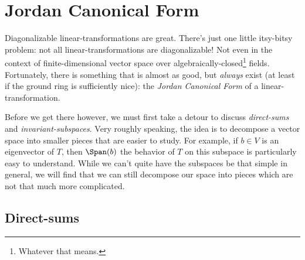 \section{Jordan Canonical Form}

Diagonalizable linear-transformations are great.  There's just one little itsy-bitsy problem:  not all linear-transformations are diagonalizable!  Not even in the context of finite-dimensional vector space over algebraically-closed\footnote{Whatever that means.} fields.  Fortunately, there is something that is almost as good, but \emph{always} exist (at least if the ground ring is sufficiently nice):  the \emph{Jordan Canonical Form} of a linear-transformation.

Before we get there however, we must first take a detour to discuss \emph{direct-sums} and \emph{invariant-subspaces}.  Very roughly speaking, the idea is to decompose a vector space into smaller pieces that are easier to study.  For example, if $b\in V$ is an eigenvector of $T$, then $\Span (b)$ the behavior of $T$ on this subspace is particularly easy to understand.  While we can't quite have the subspaces be that simple in general, we will find that we can still decompose our space into pieces which are not that much more complicated.

\subsection{Direct-sums}

